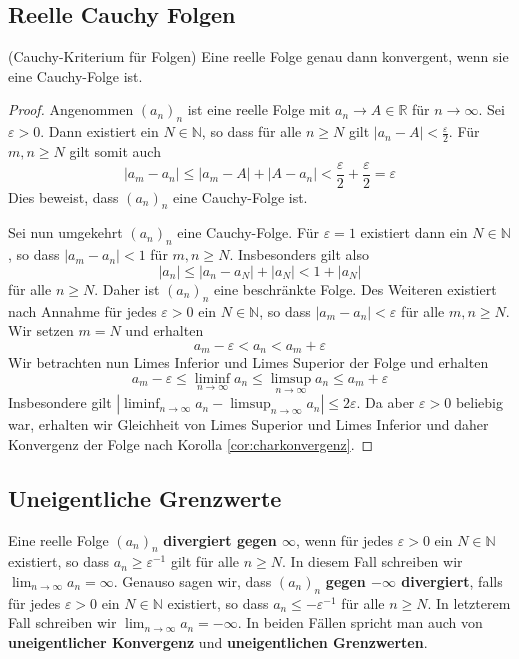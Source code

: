 \documentclass[../Analysis1_script.tex]{subfiles}
\begin{document}
\subsection{Reelle Cauchy Folgen}

\begin{proposition}{(Cauchy-Kriterium für Folgen)}
	Eine reelle Folge genau dann konvergent, wenn sie eine Cauchy-Folge ist. 
\end{proposition}

\begin{proof}
	Angenommen $(a_n)_n$ ist eine reelle Folge mit $a_n \to A \in \mathbb{R}$ für $n \to \infty$. Sei $\varepsilon > 0$. Dann existiert ein $N \in \mathbb{N}$, so dass für alle $n \geq N$ gilt $|a_n - A| < \frac{\varepsilon}{2}$. Für $m, n \geq N$ gilt somit auch 
	\[|a_m - a_n| \leq |a_m - A| + |A - a_n| < \frac{\varepsilon}{2} + \frac{\varepsilon}{2} = \varepsilon\]
	Dies beweist, dass $(a_n)_n$ eine Cauchy-Folge ist.
	
	Sei nun umgekehrt $(a_n)_n$ eine Cauchy-Folge. Für $\varepsilon = 1$ existiert dann ein $N \in \mathbb{N}$, so dass $|a_m - a_n| < 1$ für $m, n \geq N$. Insbesonders gilt also 
	\[|a_n| \leq |a_n - a_N| + |a_N| < 1 + |a_N|\]
	für alle $n \geq N$. Daher ist $(a_n)_n$ eine beschränkte Folge. Des Weiteren existiert nach Annahme für jedes $\varepsilon > 0$ ein $N \in \mathbb{N}$, so dass $|a_m - a_n| < \varepsilon$ für alle $m, n \geq N$. Wir setzen $m = N$ und erhalten
	\[a_m - \varepsilon < a_n < a_m + \varepsilon\]
	Wir betrachten nun Limes Inferior und Limes Superior der Folge und erhalten
	\[a_m - \varepsilon \leq \liminf_{n\to \infty} a_n \leq \limsup_{n \to \infty} a_n \leq a_m + \varepsilon\]
	Insbesondere gilt $|\liminf _{n\to \infty }a_n-\limsup _{n\to \infty }a_n|\leq 2\varepsilon$. Da aber $\varepsilon > 0$ beliebig war, erhalten wir Gleichheit von Limes Superior und Limes Inferior und daher Konvergenz der Folge nach Korolla \ref{cor:charkonvergenz}.
\end{proof}


\subsection{Uneigentliche Grenzwerte}

\begin{definition}
	Eine reelle Folge $(a_n)_n$ \textbf{divergiert gegen $\infty$}, wenn für jedes $\varepsilon > 0$ ein $N \in \mathbb{N}$ existiert, so dass $a_n \geq \varepsilon^{-1}$ gilt für alle $n \geq N$. In diesem Fall schreiben wir $\lim_{n\to \infty} a_n = \infty$. Genauso sagen wir, dass $(a_n)_n$ \textbf{gegen $-\infty$ divergiert}, falls für jedes $\varepsilon > 0$ ein $N \in \mathbb{N}$ existiert, so dass $a_n \leq -\varepsilon^{-1}$ für alle $n \geq N$. In letzterem Fall schreiben wir $\lim_{n \to \infty} a_n = -\infty$. In beiden Fällen spricht man auch von \textbf{uneigentlicher Konvergenz} und \textbf{uneigentlichen Grenzwerten}. 
\end{definition}
\end{document}
